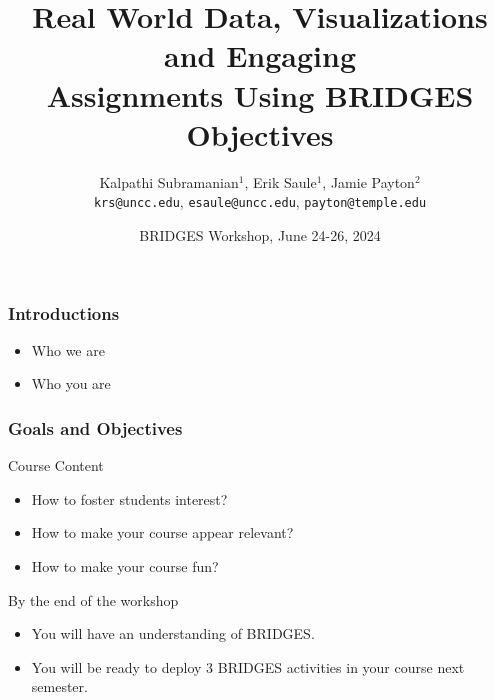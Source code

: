 \documentclass[aspectratio=169]{beamer}
\title[Objectives]{Real World Data, Visualizations and Engaging \\Assignments Using BRIDGES\vspace*{0.05in}\\Objectives}
\subtitle{}
\author{Kalpathi Subramanian$^1$, Erik Saule$^1$, Jamie Payton$^2$\\\texttt{krs@uncc.edu}, \texttt{esaule@uncc.edu}, \texttt{payton@temple.edu} }
\institute{$^1$The University of North Carolina at Charlotte\\$^2$Temple University}
\date{BRIDGES Workshop, June 24-26, 2024}
\begin{document}
\begin{frame}
\titlepage

\end{frame}


\begin{frame}
  \frametitle{Introductions}

  \begin{itemize}
  \item Who we are
  \item Who you are
  \end{itemize}
\end{frame}

\begin{frame}
  \frametitle{Goals and Objectives}


    
    \begin{block}{Course Content}
      \begin{itemize}
      \item How to foster students interest?
      \item How to make your course appear relevant?
      \item How to make your course fun?
      \end{itemize}
    \end{block}


  \begin{block}{By the end of the workshop}
    \begin{itemize}
    \item You will have an understanding of BRIDGES.
    \item You will be ready to deploy 3 BRIDGES activities in your course next semester.
    \end{itemize}
  \end{block}

  
\end{frame}
\end{document}
